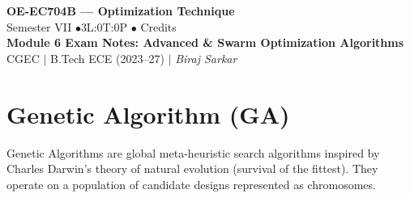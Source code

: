 \documentclass[12pt,a4paper]{article}
\begin{document}

\begin{center}
  {\LARGE\bfseries\color{myred} OE-EC704B --- Optimization Technique}\\[5pt]
  {\normalsize\color{mydark} Semester VII \quad$\bullet$\quad 3L:0T:0P \quad$\bullet$ Credits}\\[3pt]
  {\normalsize\color{myteal}\textbf{Module 6 Exam Notes: Advanced \& Swarm Optimization Algorithms}}\\[3pt]
  {\small\color{mydark} CGEC \;$|$\; B.Tech ECE (2023--27) \;$|$\; \textit{Biraj Sarkar}}
\end{center}
\vspace{2pt}
\noindent{\color{myred}\rule{\linewidth}{1.5pt}}
\vspace{2pt}

\hypersetup{linkcolor=mydark}
\tableofcontents
\hypersetup{linkcolor=myteal}
\newpage

\section{Genetic Algorithm (GA)}

Genetic Algorithms are global meta-heuristic search algorithms inspired by Charles Darwin's theory of natural evolution (survival of the fittest). They operate on a population of candidate designs represented as chromosomes.
\end{document}
